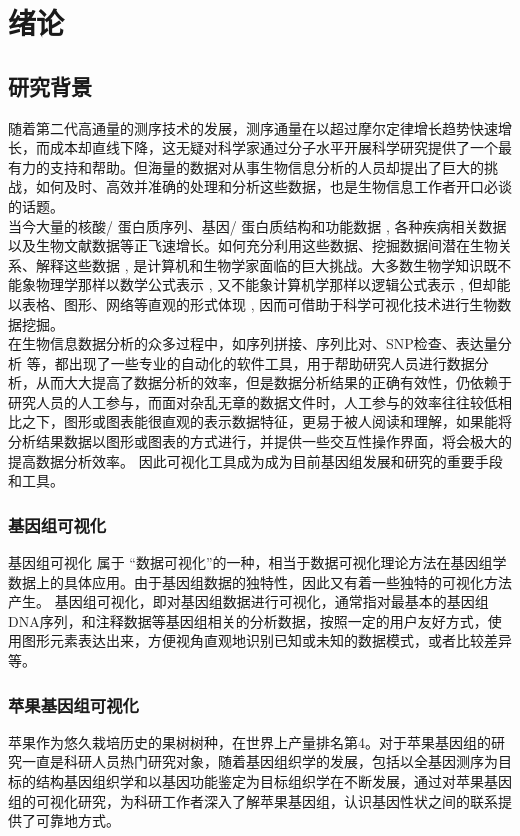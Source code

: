 \chapter{绪论}
	\section{研究背景}
	随着第二代高通量的测序技术的发展，测序通量在以超过摩尔定律增长趋势快速增长，而成本却直线下降，这无疑对科学家通过分子水平开展科学研究提供了一个最有力的支持和帮助。但海量的数据对从事生物信息分析的人员却提出了巨大的挑战，如何及时、高效并准确的处理和分析这些数据，也是生物信息工作者开口必谈的话题。\\
	\indent 当今大量的核酸/ 蛋白质序列、基因/ 蛋白质结构和功能数据 , 各种疾病相关数据以及生物文献数据等正飞速增长。如何充分利用这些数据、挖掘数据间潜在生物关系、解释这些数据 , 是计算机和生物学家面临的巨大挑战。大多数生物学知识既不能象物理学那样以数学公式表示 , 又不能象计算机学那样以逻辑公式表示 , 但却能以表格、图形、网络等直观的形式体现 , 因而可借助于科学可视化技术进行生物数据挖掘。\\
	\indent 在生物信息数据分析的众多过程中，如序列拼接、序列比对、SNP检查、表达量分析 等，都出现了一些专业的自动化的软件工具，用于帮助研究人员进行数据分析，从而大大提高了数据分析的效率，但是数据分析结果的正确有效性，仍依赖于研究人员的人工参与，而面对杂乱无章的数据文件时，人工参与的效率往往较低相比之下，图形或图表能很直观的表示数据特征，更易于被人阅读和理解，如果能将分析结果数据以图形或图表的方式进行，并提供一些交互性操作界面，将会极大的提高数据分析效率。 因此可视化工具成为成为目前基因组发展和研究的重要手段和工具。
		\subsection{基因组可视化}
		基因组可视化 属于 “数据可视化”的一种，相当于数据可视化理论方法在基因组学数据上的具体应用。由于基因组数据的独特性，因此又有着一些独特的可视化方法产生。
		基因组可视化，即对基因组数据进行可视化，通常指对最基本的基因组DNA序列，和注释数据等基因组相关的分析数据，按照一定的用户友好方式，使用图形元素表达出来，方便视角直观地识别已知或未知的数据模式，或者比较差异等。
		\subsection{苹果基因组可视化}
		苹果作为悠久栽培历史的果树树种，在世界上产量排名第4。对于苹果基因组的研究一直是科研人员热门研究对象，随着基因组织学的发展，包括以全基因测序为目标的结构基因组织学和以基因功能鉴定为目标组织学在不断发展，通过对苹果基因组的可视化研究，为科研工作者深入了解苹果基因组，认识基因性状之间的联系提供了可靠地方式。
